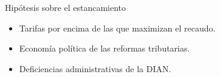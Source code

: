 \begin{frame}{Hipótesis sobre el estancamiento}
\begin{itemize}
    \item Tarifas por encima de las que maximizan el recaudo.
    \item Economía política de las reformas tributarias.
    \item Deficiencias administrativas de la DIAN.
\end{itemize}
\end{frame}